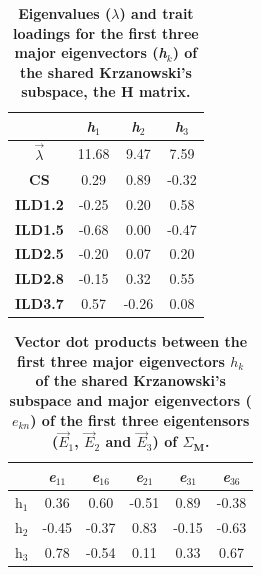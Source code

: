 \begin{table}[!htbp]
\caption[Eigenvalues ($\lambda$) and trait loadings for the first three major eigenvectors (\textit{\textbf{h}}$_{\textit{k}}$) of the shared Krzanowski's subspace, the H matrix.]{\textbf{Eigenvalues ($\lambda$) and trait loadings for the first three major eigenvectors (\textit{\textbf{h}}$_{\textit{k}}$) of the shared Krzanowski's subspace, the H matrix.}}
\label{tab:multi_Heigvals}
\begin{center}
\begin{tabular}{>{\bfseries}cS[table-format=2.2]S[table-format=2.2]S[table-format=2.2]}
\toprule
& {\textit{h}$_{\textit{1}}$} & {\textit{h}$_{\textit{2}}$} & {\textit{h}$_{\textit{3}}$}\\
\midrule
$\vec{\lambda}$ & 11.68 & 9.47 & 7.59 \\
CS & 0.29 & 0.89 & -0.32\\
 ILD1.2 & -0.25 & 0.20 & 0.58\\
 ILD1.5 & -0.68 & 0.00 & -0.47\\
ILD2.5 & -0.20 & 0.07 & 0.20\\
 ILD2.8 & -0.15 & 0.32 & 0.55\\
 ILD3.7 & 0.57 &-0.26 & 0.08\\
\bottomrule
\end{tabular}
\end{center}
\end{table}


\newpage
\begin{table}[!htbp]
\caption[Vector dot products between the first three major eigenvectors $h_k$ of the shared Krzanowski's subspace and major eigenvectors ($e_{kn}$) of the first three eigentensors ($\vec{E}_{1}$, $\vec{E}_{2}$ and $\vec{E}_{3}$) of $\Sigma_{\textbf{M}}$.]{\textbf{Vector dot products between the first three major eigenvectors $h_k$ of the shared Krzanowski's subspace and major eigenvectors ($e_{kn}$) of the first three eigentensors ($\vec{E}_{1}$, $\vec{E}_{2}$ and $\vec{E}_{3}$) of $\Sigma_{\textbf{M}}$.}}
\label{tab:multi_VecDotProd}
\begin{center}
\begin{tabular}{cS[table-format=2.2]S[table-format=2.2]S[table-format=2.2]S[table-format=2.2]S[table-format=2.2]}
\toprule
& {\textit{e}$_{\textit{11}}$} & {\textit{e}$_{\textit{16}}$} &
{\textit{e}$_{\textit{21}}$} & {\textit{e}$_{\textit{31}}$} & {\textit{e}$_{\textit{36}}$} \\
\midrule
$\textit{h}_{1}$  & 0.36	& 0.60	& -0.51 & 0.89	& -0.38\\
$\textit{h}_{2}$  & -0.45	& -0.37	& 0.83	& -0.15	& -0.63\\
$\textit{h}_{3}$  & 0.78	& -0.54	& 0.11	& 0.33	& 0.67 \\
\bottomrule
\end{tabular}
\end{center}
\end{table}

